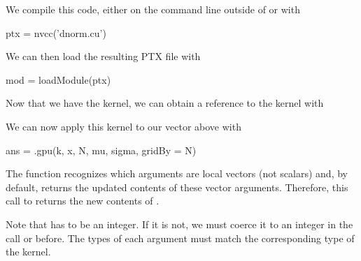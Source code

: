 We compile this code,  either on the command line outside 
of \R{} or with 
\begin{RCode}
ptx = nvcc('dnorm.cu')
\end{RCode}
We can then load the resulting PTX file with
\begin{RCode}
mod = loadModule(ptx)
\end{RCode}

Now that we have the kernel, we can obtain
a reference to the kernel with
We can now apply this kernel to our vector above with
\begin{RCode}
ans = .gpu(k, x, N, mu, sigma, gridBy = N)
\end{RCode}
The  function recognizes which arguments
are local vectors (not scalars) and, by default, returns
the updated contents of these vector arguments.
Therefore, this call to  returns the new
contents of .

Note that  has to be an integer. If it is not, we must coerce
it to an integer in the call or before.  The types of each argument
must match the corresponding type of the kernel. 


